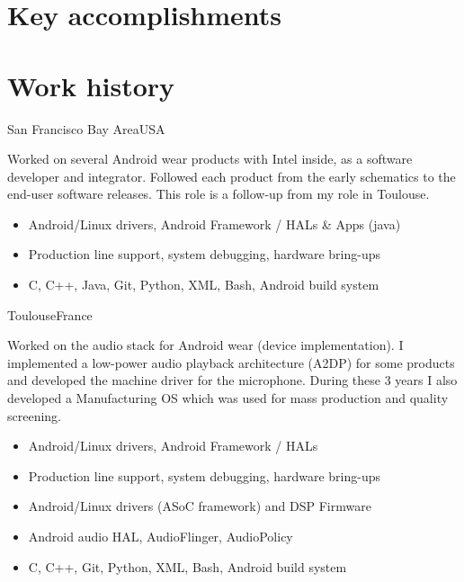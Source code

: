 \documentclass[a4paper,11pt,sans]{moderncv}
\begin{document}
\section{Key accomplishments}
\begin{cvcolumns}
\end{cvcolumns}
\begin{cvcolumns}
\end{cvcolumns}


\section{Work history}
{San Francisco Bay Area}{USA}
{
  Worked on several Android wear products with Intel inside, as a software developer and integrator.
  Followed each product from the early schematics to the end-user software releases.
  This role is a follow-up from my role in Toulouse.
    \begin{itemize}
        \item Android/Linux drivers, Android Framework / HALs \& Apps (java)
        \item Production line support, system debugging, hardware bring-ups
        \item C, C++, Java, Git, Python, XML, Bash, Android build system
    \end{itemize}
}

{Toulouse}{France}
{
  Worked on the audio stack for Android wear (device implementation). I implemented a low-power audio playback architecture (A2DP) for some products and developed the machine driver for the microphone.
  During these 3 years I also developed a Manufacturing OS which was used for mass production and quality screening.
    \begin{itemize}
        \item Android/Linux drivers, Android Framework / HALs
        \item Production line support, system debugging, hardware bring-ups
        \item Android/Linux drivers (ASoC framework) and DSP Firmware
        \item Android audio HAL, AudioFlinger, AudioPolicy
        \item C, C++, Git, Python, XML, Bash, Android build system
    \end{itemize}
}
\end{document}
